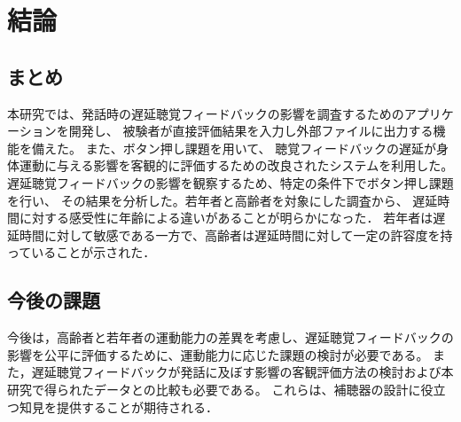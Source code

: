 \section{結論}
\subsection{まとめ}
本研究では、発話時の遅延聴覚フィードバックの影響を調査するためのアプリケーションを開発し、
被験者が直接評価結果を入力し外部ファイルに出力する機能を備えた。
また、ボタン押し課題を用いて、
聴覚フィードバックの遅延が身体運動に与える影響を客観的に評価するための改良されたシステムを利用した。
遅延聴覚フィードバックの影響を観察するため、特定の条件下でボタン押し課題を行い、
その結果を分析した。若年者と高齢者を対象にした調査から、
遅延時間に対する感受性に年齢による違いがあることが明らかになった．
若年者は遅延時間に対して敏感である一方で、高齢者は遅延時間に対して一定の許容度を持っていることが示された．
\subsection{今後の課題}
今後は，高齢者と若年者の運動能力の差異を考慮し、遅延聴覚フィードバックの影響を公平に評価するために、運動能力に応じた課題の検討が必要である。
また，遅延聴覚フィードバックが発話に及ぼす影響の客観評価方法の検討および本研究で得られたデータとの比較も必要である。
これらは、補聴器の設計に役立つ知見を提供することが期待される．
